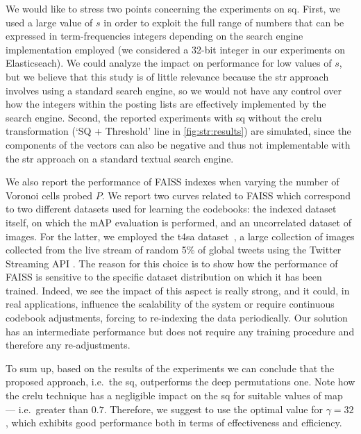 We would like to stress two points concerning the experiments on \gls{sq}.
First, we used a large value of $s$ in order to exploit the full range of numbers that can be expressed in term-frequencies integers depending on the search engine implementation employed (we considered a 32-bit integer in our experiments on Elasticseach).
We could analyze the impact on performance for low values of $s$, but we believe that this study is of little relevance because the \gls{str} approach involves using a standard search engine, so we would not have any control over how the integers within the posting lists are effectively implemented by the search engine.
Second, the reported experiments with \gls{sq} without the \gls{crelu} transformation (`SQ + Threshold' line in \ref{fig:str:results}) are simulated, since the components of the vectors can also be negative and thus not implementable with the \gls{str} approach on a standard textual search engine.

We also report the performance of FAISS indexes when varying the number of Voronoi cells probed $P$.
We report two curves related to FAISS which correspond to two different datasets used for learning the codebooks: the indexed dataset itself, on which the mAP evaluation is performed, and an uncorrelated dataset of images.
For the latter, we employed the \gls{t4sa} dataset~\cite{vadicamo2017cross}, a large collection of images collected from the live stream of random 5\% of global tweets using the Twitter Streaming API .
The reason for this choice is to show how the performance of FAISS is sensitive to the specific dataset distribution on which it has been trained.
Indeed, we see the impact of this aspect is really strong, and it could, in real applications, influence the scalability of the system or require continuous codebook adjustments, forcing to re-indexing the data periodically.
Our solution has an intermediate performance but does not require any training procedure and therefore any re-adjustments.

To sum up, based on the results of the experiments we can conclude that the proposed approach, i.e.\ the \gls{sq}, outperforms the deep permutations one.
Note how the \gls{crelu} technique has a negligible impact on the \gls{sq} for suitable values of \gls{map} --- i.e.\ greater than $0.7$.
Therefore, we suggest to use the optimal value for $\gamma=32$, which exhibits good performance both in terms of effectiveness and efficiency.

